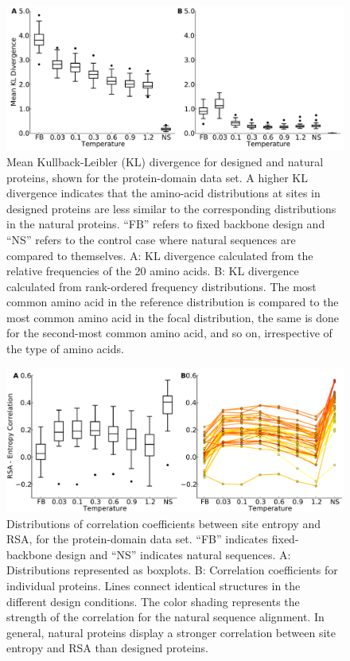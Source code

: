 \documentclass[12pt]{article}
\begin{document}
\begin{figure}[H]
\centerline{\includegraphics[width = 6in]{figures/Mean_KL_vs_Temp_Boxplot.pdf}}
\caption{Mean Kullback-Leibler (KL) divergence for designed and natural proteins, shown for the protein-domain data set. A higher KL divergence indicates that the amino-acid distributions at sites in designed proteins are less similar to the corresponding distributions in the natural proteins. ``FB'' refers to fixed backbone design and ``NS'' refers to the control case where natural sequences are compared to themselves. A: KL divergence calculated from the relative frequencies of the 20 amino acids. B: KL divergence calculated from rank-ordered frequency distributions. The most common amino acid in the reference distribution is compared to the most common amino acid in the focal distribution, the same is done for the second-most common amino acid, and so on, irrespective of the type of amino acids.}
\label{AADisFig1}
\end{figure}


\begin{figure}[H]
\centerline{\includegraphics[width = 6in]{figures/Cor_Mean_Entropy_RSA_Combination_Plot.pdf}}
\caption{Distributions of correlation coefficients between site entropy and RSA, for the protein-domain data set. ``FB'' indicates fixed-backbone design and ``NS'' indicates natural sequences. A: Distributions represented as boxplots. B: Correlation coefficients for individual proteins. Lines connect identical structures in the different design conditions. The color shading represents the strength of the correlation for the natural sequence alignment. In general, natural proteins display a stronger correlation between site entropy and RSA than designed proteins.}
\label{Correlation_figure}
\end{figure}
\end{document}

